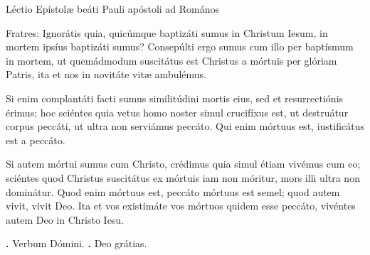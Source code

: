 
Léctio Epístolæ beáti Pauli apóstoli ad Romános

Fratres: Ignorátis quia, quicúmque baptizáti sumus in Christum Iesum, in mortem ipsíus baptizáti sumus?
Consepúlti ergo sumus cum illo per baptísmum in mortem, ut quemádmodum suscitátus est Christus a mórtuis per glóriam Patris, ita et nos in novitáte vitæ ambulémus.

Si enim complantáti facti sumus similitúdini mortis eius, sed et resurrectiónis érimus; hoc sciéntes quia vetus homo noster simul crucifíxus est, ut destruátur corpus peccáti, ut ultra non serviámus peccáto.
Qui enim mórtuus est, iustificátus est a peccáto.

Si autem mórtui sumus cum Christo, crédimus quia simul étiam vivémus cum eo; sciéntes quod Christus suscitátus ex mórtuis iam non móritur, mors illi ultra non dominátur.
Quod enim mórtuus est, peccáto mórtuus est semel; quod autem vivit, vivit Deo.
Ita et vos existimáte vos mórtuos quidem esse peccáto, vivéntes autem Deo in Christo Iesu.

\textbf{\Vbar.} Verbum Dómini.
\textbf{\Rbar.} Deo grátias.
\par